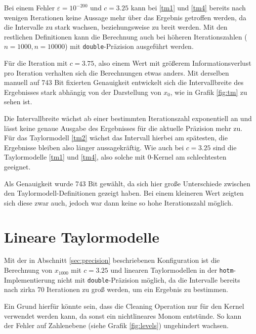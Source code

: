 Bei einem Fehler $\varepsilon = 10^{-200}$ und $c=3.25$ kann bei \ref{tm1} und \ref{tm4} bereits nach wenigen Iterationen keine Aussage mehr über das Ergebnis getroffen werden, da die Intervalle zu stark wachsen, beziehungsweise zu breit werden. Mit den restlichen Definitionen kann die Berechnung auch bei höheren Iterationszahlen ($n=1000, n=10000$) mit \verb+double+-Präzision ausgeführt werden.  
   

Für die Iteration mit $c=3.75$, also einem Wert mit größerem Informationsverlust pro Iteration verhalten sich die Berechnungen etwas anders. Mit derselben manuell auf 743 Bit fixierten Genauigkeit entwickelt sich die Intervallbreite des Ergebnisses stark abhängig von der Darstellung von $x_0$, wie in Grafik \ref{fig:tm} zu sehen ist.  
          


Die Intervallbreite wächst ab einer bestimmten Iterationszahl exponentiell an und lässt keine genaue Ausgabe des Ergebnisses für die aktuelle Präzision mehr zu. Für das Taylormodell \ref{tm2} wächst das Intervall hierbei am spätesten, die Ergebnisse bleiben also länger aussagekräftig. Wie auch bei $c=3.25$ sind die Taylormodelle \ref{tm1} und \ref{tm4}, also solche mit 0-Kernel am schlechtesten geeignet.


Als Genauigkeit wurde 743 Bit gewählt, da sich hier große Unterschiede zwischen den Taylormodell-Definitionen gezeigt haben. Bei einem kleineren Wert zeigten sich diese zwar auch, jedoch war dann keine so hohe Iterationszahl möglich.




\section{Lineare Taylormodelle}
Mit der in Abschnitt \ref{sec:precision} beschriebenen Konfiguration ist die Berechnung von $x_{1000}$ mit $c=3.25$ und linearen Taylormodellen in der \verb+hotm+-Implementierung nicht mit \verb+double+-Präzision möglich, da die Intervalle bereits nach zirka 70 Iterationen zu groß werden, um ein Ergebnis zu bestimmen.

Ein Grund hierfür könnte sein, dass die Cleaning Operation nur für den Kernel verwendet werden kann, da sonst ein nichtlineares Monom entstünde. So kann der Fehler auf Zahlenebene (siehe Grafik \ref{fig:levels}) ungehindert wachsen.









